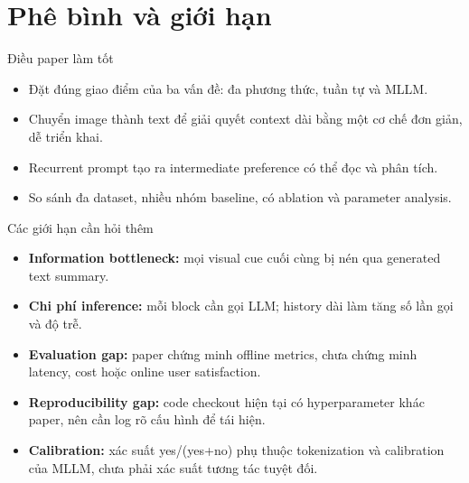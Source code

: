 \section{Phê bình và giới hạn}
\begin{frame}{Điều paper làm tốt}
  \begin{itemize}
    \item Đặt đúng giao điểm của ba vấn đề: đa phương thức, tuần tự và MLLM.
    \item Chuyển image thành text để giải quyết context dài bằng một cơ chế đơn giản, dễ triển khai.
    \item Recurrent prompt tạo ra intermediate preference có thể đọc và phân tích.
    \item So sánh đa dataset, nhiều nhóm baseline, có ablation và parameter analysis.
  \end{itemize}
\end{frame}

\begin{frame}{Các giới hạn cần hỏi thêm}
  \begin{itemize}
    \item \textbf{Information bottleneck:} mọi visual cue cuối cùng bị nén qua generated text summary.
    \item \textbf{Chi phí inference:} mỗi block cần gọi LLM; history dài làm tăng số lần gọi và độ trễ.
    \item \textbf{Evaluation gap:} paper chứng minh offline metrics, chưa chứng minh latency, cost hoặc online user satisfaction.
    \item \textbf{Reproducibility gap:} code checkout hiện tại có hyperparameter khác paper, nên cần log rõ cấu hình để tái hiện.
    \item \textbf{Calibration:} xác suất yes/(yes+no) phụ thuộc tokenization và calibration của MLLM, chưa phải xác suất tương tác tuyệt đối.
  \end{itemize}
\end{frame}

